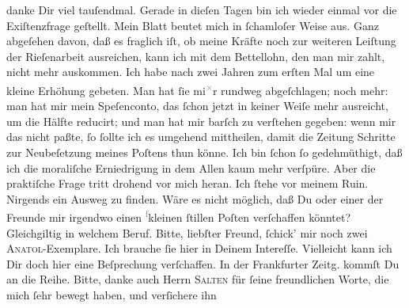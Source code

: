 \begin{ledgroupsized}[t]{13cm}
               danke Dir viel tauſendmal.\pend
           \pstart
           Gerade in dieſen Tagen bin ich wieder einmal vor die Exiſtenzfrage geſtellt. Mein Blatt beutet mich {\pb}in ſchamloſer Weise aus. Ganz abgeſehen davon, daß
               es fraglich iſt, ob meine Kräfte noch zur weiteren Leiſtung der Rieſenarbeit
               ausreichen, kann ich mit dem Bettellohn, den man mir zahlt, nicht mehr auskommen. Ich
               habe nach zwei Jahren zum erſten Mal um eine kleine Erhöhung gebeten. Man hat ſie mi\substVorne{}\textsuperscript{\textcolor{gray}{×}}\substDazwischen{}r\substHinten{} rundweg abgeſchlagen; noch mehr: man hat mir mein Speſenconto, das ſchon
               jetzt in keiner Weiſe mehr ausreicht, um die Hälfte reducirt; und man hat mir barſch
                  {\pb}zu verſtehen gegeben: wenn mir das nicht paßte,
               ſo ſollte ich es umgehend mittheilen, damit die Zeitung Schritte zur Neubeſetzung meines Poſtens thun könne.
               Ich bin ſchon ſo gedehmüthigt, daß  ich die moraliſche Erniedrigung in dem Allen kaum mehr verſpüre. Aber die
               praktiſche Frage tritt drohend vor mich heran. Ich ſtehe vor meinem Ruin. Nirgends
               ein Ausweg zu finden. Wäre es nicht möglich, daß Du oder einer der Freunde mir
               irgendwo einen \substVorne{}\textsuperscript{\textcolor{gray}{ſ}}\substDazwischen{}k\substHinten{}leinen ſtillen Poſten verſchaffen könntet? Gleichgiltig in welchem Beruf.\pend
           \pstart
           {\pb}Bitte, liebſter Freund, ſchick’ mir noch zwei \textsc{Anatol}-Exemplare. Ich brauche ſie hier in Deinem Intereſſe. Vielleicht kann ich Dir
               doch hier eine Beſprechung verſchaffen. In der Frankfurter Zeitg. kommſt Du \label{K_L02605-1v}\label{K_L02605-1h} an die Reihe.\pend
           \pstart
           Bitte, danke auch Herrn \textsc{Salten} für ſeine freundlichen Worte, die mich ſehr bewegt haben, und verſichere ihn

\end{ledgroupsized}
